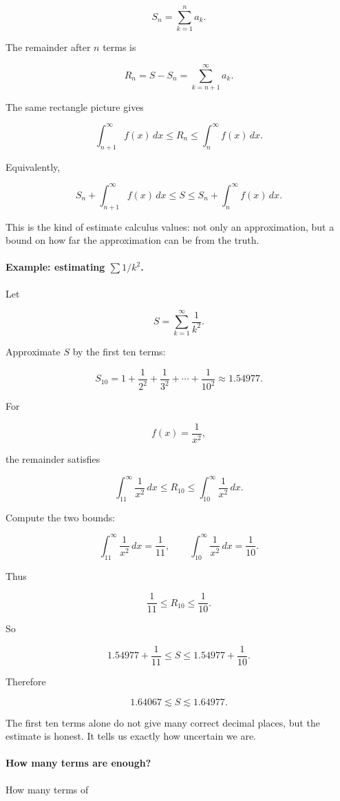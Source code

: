 \[
S_n=\sum_{k=1}^{n}a_k.
\]

The remainder after \(n\) terms is

\[
R_n=S-S_n=\sum_{k=n+1}^{\infty}a_k.
\]

The same rectangle picture gives

\[
\boxed{
\int_{n+1}^{\infty}f(x)\,dx
\le
R_n
\le
\int_n^{\infty}f(x)\,dx.
}
\]

Equivalently,

\[
\boxed{
S_n+\int_{n+1}^{\infty}f(x)\,dx
\le
S
\le
S_n+\int_n^{\infty}f(x)\,dx.
}
\]

This is the kind of estimate calculus values: not only an approximation, but a bound on
how far the approximation can be from the truth.

\paragraph{Example: estimating \(\sum 1/k^2\).}
Let

\[
S=\sum_{k=1}^{\infty}\frac1{k^2}.
\]

Approximate \(S\) by the first ten terms:

\[
S_{10}=1+\frac1{2^2}+\frac1{3^2}+\cdots+\frac1{10^2}\approx1.54977.
\]

For

\[
f(x)=\frac1{x^2},
\]

the remainder satisfies

\[
\int_{11}^{\infty}\frac1{x^2}\,dx
\le
R_{10}
\le
\int_{10}^{\infty}\frac1{x^2}\,dx.
\]

Compute the two bounds:

\[
\int_{11}^{\infty}\frac1{x^2}\,dx=\frac1{11},
\qquad
\int_{10}^{\infty}\frac1{x^2}\,dx=\frac1{10}.
\]

Thus

\[
\frac1{11}\le R_{10}\le \frac1{10}.
\]

So

\[
1.54977+\frac1{11}
\le
S
\le
1.54977+\frac1{10}.
\]

Therefore

\[
\boxed{
1.64067\lesssim S\lesssim1.64977.
}
\]

The first ten terms alone do not give many correct decimal places, but the estimate is
honest.  It tells us exactly how uncertain we are.

\paragraph{How many terms are enough?}
How many terms of

